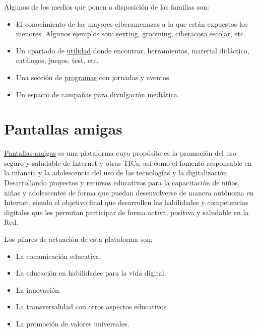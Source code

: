 \documentclass[
  a4paper,
  openany]{book}
\begin{document}
Algunos de los medios que ponen a disposición de las familias son:

\begin{itemize}
\item
  El conocimiento de las mayores ciberamenazas a la que están expuestos los menores. Algunos ejemplos son: \href{https://www.is4k.es/necesitas-saber/sexting}{sexting}, \href{https://www.is4k.es/necesitas-saber/grooming}{grooming}, \href{https://www.is4k.es/necesitas-saber/ciberacoso-escolar}{ciberacoso escolar}, etc.
\item
  Un apartado de \href{https://www.is4k.es/de-utilidad}{utilidad} donde encontrar, herramientas, material didáctico, catálogos, juegos, test, etc.
\item
  Una sección de \href{https://www.is4k.es/programas}{programas} con jornadas y eventos.
\item
  Un espacio de \href{https://www.is4k.es/campanas}{campañas} para divulgación mediática.
\end{itemize}

\hypertarget{pantallas-amigas}{%
\section{Pantallas amigas}\label{pantallas-amigas}}

\href{https://www.pantallasamigas.net/}{Pantallas amigas} es una plataforma cuyo propósito es la promoción del uso seguro y saludable de Internet y otras TICs, así como el fomento responsable en la infancia y la adolescencia del uso de las tecnologías y la digitalización. Desarrollando proyectos y recursos educativos para la capacitación de niños, niñas y adolescentes de forma que puedan desenvolverse de manera autónoma en Internet, siendo el objetivo final que desarrollen las habilidades y competencias digitales que les permitan participar de forma activa, positiva y saludable en la Red.

Los pilares de actuación de esta plataforma son:

\begin{itemize}
\item
  La comunicación educativa.
\item
  La educación en habilidades para la vida digital.
\item
  La innovación.
\item
  La transversalidad con otros aspectos educativos.
\item
  La promoción de valores universales.
\end{itemize}
\end{document}
